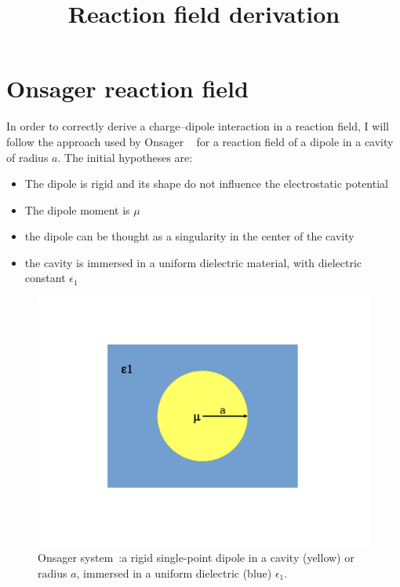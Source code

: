 \documentclass[11pt,oneside,a4paper]{article}
\title{Reaction field derivation}
\begin{document}





\section{Onsager reaction field}
\label{sec:onsager}

In order to correctly derive a charge--dipole interaction in a reaction field, I will follow the approach used by Onsager ~\cite{onsager1936electric} for a reaction field of a dipole in a cavity of radius $a$.
The initial hypotheses are: 
\begin{itemize}
 \item The dipole is rigid and its shape do not influence the electrostatic potential
 \item The dipole moment is $\mu$
 \item the dipole can be thought as a singularity in the center of the cavity
 \item the cavity is immersed in a uniform dielectric material, with dielectric constant $\epsilon_1$
\end{itemize}


\begin{figure}[h!]
\caption{Onsager system~\cite{onsager1936electric}:a rigid single-point dipole in a cavity (yellow) or radius $a$, immersed in a uniform dielectric (blue) $\epsilon_1$.\label{fig:cavityOnsager}}
 \includegraphics[width=\textwidth]{figures/Onsager.pdf}
 \centering
\end{figure}
\end{document}
